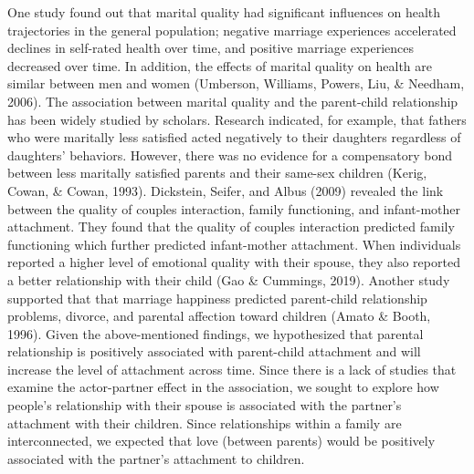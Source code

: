 \documentclass[man]{apa6}
\begin{document}
One study found out that marital quality had significant influences on health trajectories in the general population; negative marriage experiences accelerated declines in self-rated health over time, and positive marriage experiences decreased over time. In addition, the effects of marital quality on health are similar between men and women (Umberson, Williams, Powers, Liu, \& Needham, 2006). The association between marital quality and the parent-child relationship has been widely studied by scholars. Research indicated, for example, that fathers who were maritally less satisfied acted negatively to their daughters regardless of daughters' behaviors. However, there was no evidence for a compensatory bond between less maritally satisfied parents and their same-sex children (Kerig, Cowan, \& Cowan, 1993). Dickstein, Seifer, and Albus (2009) revealed the link between the quality of couples interaction, family functioning, and infant-mother attachment. They found that the quality of couples interaction predicted family functioning which further predicted infant-mother attachment. When individuals reported a higher level of emotional quality with their spouse, they also reported a better relationship with their child (Gao \& Cummings, 2019). Another study supported that that marriage happiness predicted parent-child relationship problems, divorce, and parental affection toward children (Amato \& Booth, 1996). Given the above-mentioned findings, we hypothesized that parental relationship is positively associated with parent-child attachment and will increase the level of attachment across time. Since there is a lack of studies that examine the actor-partner effect in the association, we sought to explore how people's relationship with their spouse is associated with the partner's attachment with their children. Since relationships within a family are interconnected, we expected that love (between parents) would be positively associated with the partner's attachment to children.
\end{document}
